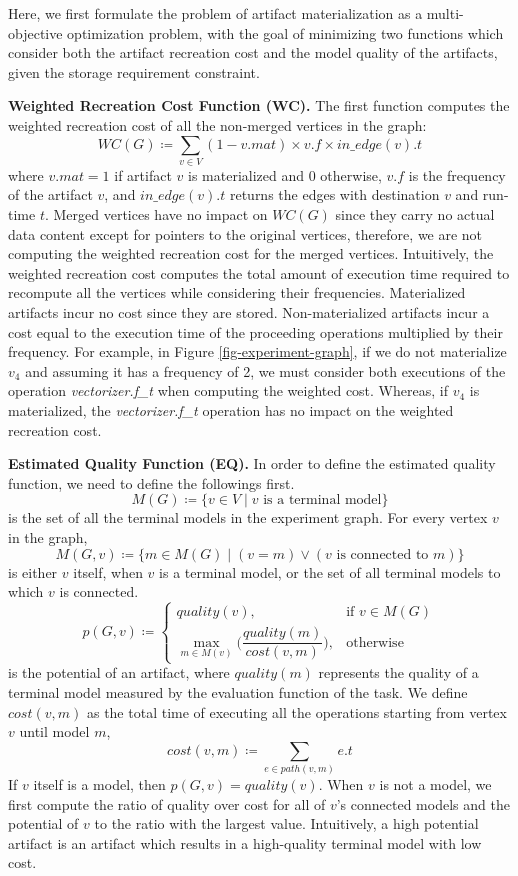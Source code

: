 Here, we first formulate the problem of artifact materialization as a multi-objective optimization problem, with the goal of minimizing two functions which consider both the artifact recreation cost and the model quality of the artifacts, given the storage requirement constraint.

\textbf{Weighted Recreation Cost Function (WC).} 
The first function computes the weighted recreation cost of all the non-merged vertices in the graph:
\[
WC(G) \coloneqq   \sum\limits_{v \in V}  (1-v.mat) \times v.f \times in\_edge(v).t
\]
where $v.mat = 1$ if artifact $v$ is materialized and $0$ otherwise, $v.f$ is the frequency of the artifact $v$, and $in\_edge(v).t$ returns the edges with destination $v$ and run-time $t$.
Merged vertices have no impact on $WC(G)$ since they carry no actual data content except for pointers to the original vertices, therefore, we are not computing the weighted recreation cost for the merged vertices.
Intuitively, the weighted recreation cost computes the total amount of execution time required to recompute all the vertices while considering their frequencies.
Materialized artifacts incur no cost since they are stored.
Non-materialized artifacts incur a cost equal to the execution time of the proceeding operations multiplied by their frequency.
For example, in Figure \ref{fig-experiment-graph}, if we do not materialize $v_4$ and assuming it has a frequency of 2, we must consider both executions of the operation \textit{vectorizer.f\_t}  when computing the weighted cost.
Whereas, if $v_4$ is materialized, the \textit{vectorizer.f\_t} operation has no impact on the weighted recreation cost.

\textbf{Estimated Quality Function (EQ).} 
In order to define the estimated quality function, we need to define the followings first.
\[
M(G) \coloneqq  \{v \in V \mid v \text{ is a terminal model}\}
\]
is the set of all the terminal models in the experiment graph.
For every vertex $v$ in the graph, 
\[
M(G, v) \coloneqq  \{m \in M(G) \mid (v = m) \vee (v \text{ is connected to } m)\}
\]
is either $v$ itself, when $v$ is a terminal model, or the set of all terminal models to which $v$ is connected.
\[
p(G, v) \coloneqq  
		\begin{cases}
		quality(v) , & \text{if } v \in M(G)  \\
		\max\limits_{m \in M(v)} \Big( \dfrac{quality(m)}{cost(v,m)} \Big) , & \text{otherwise}
		\end{cases}
\]
is the potential of an artifact, where $quality(m)$ represents the quality of a terminal model measured by the evaluation function of the task.
We define $cost(v,m)$ as the total time of executing all the operations starting from vertex $v$ until model $m$,
\[
cost(v,m) \coloneqq \sum\limits_{e \in path(v, m)} e.t
\]
If $v$ itself is a model, then $p(G, v) = quality(v)$.
When $v$ is not a model, we first compute the ratio of quality over cost for all of $v$'s connected models and the potential of $v$ to the ratio with the largest value.
Intuitively, a high potential artifact is an artifact which results in a high-quality terminal model with low cost.

